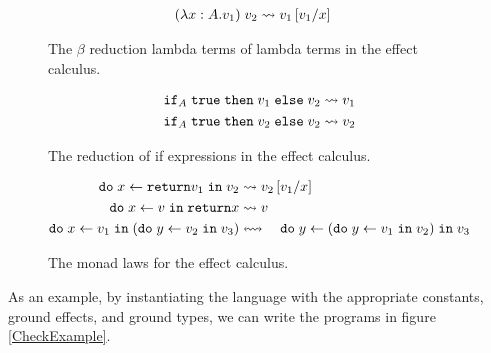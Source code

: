 \documentclass{Report}
\begin{document}
\begin{figure}
    \begin{framed}
        \begin{align*}
            \apply{(\lam{x}{A}{v_1})}{v_2} & \rightsquigarrow v_1\ssub{x}{v_1}
        \end{align*}
    \end{framed}
    \caption{The $\beta$ reduction lambda terms of lambda terms in the effect calculus.}
    \label{ECBeta}
\end{figure}

\begin{figure}
    \begin{framed}
        \begin{align*}
            \pifthenelse{A}{\t}{v_1}{v_2} & \rightsquigarrow v_1\\
            \pifthenelse{A}{\t}{v_2}{v_2} & \rightsquigarrow v_2\\
        \end{align*}
    \end{framed}
    \caption{The reduction of if expressions in the effect calculus.}
    \label{ECIf}
\end{figure}


\begin{figure}
    \begin{framed}
        \begin{align*}
            \doin{x}{\return{v_1}}{v_2} & \rightsquigarrow v_2\ssub{x}{v_1}\\
            \doin{x}{v}{\return{x}} & \rightsquigarrow v\\
            \doin{x}{v_1}{(\doin{y}{v_2}{v_3})} 
            & \leftrightsquigarrow\quad  \doin{y}{(\doin{y}{v_1}{v_2})}{v_3}
        \end{align*}
    \end{framed}
    \caption{The monad laws for the effect calculus.}
    \label{ECMonads}
\end{figure}



As an example, by instantiating the language with the appropriate constants, ground effects, and ground types, we can write the programs in figure \ref{CheckExample}.
\end{document}
